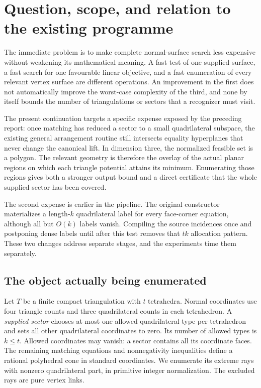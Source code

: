 \section{Question, scope, and relation to the existing programme}
\label{sec:context}

The immediate problem is to make complete normal-surface search less
expensive without weakening its mathematical meaning.  A fast test of
one supplied surface, a fast search for one favourable linear objective,
and a fast enumeration of every relevant vertex surface are different
operations.  An improvement in the first does not automatically improve
the worst-case complexity of the third, and none by itself bounds the
number of triangulations or sectors that a recognizer must visit.

The present continuation targets a specific expense exposed by the
preceding report: once matching has reduced a sector to a small
quadrilateral subspace, the existing general arrangement routine still
intersects equality hyperplanes that never change the canonical lift.
In dimension three, the normalized feasible set is a polygon.  The
relevant geometry is therefore the overlay of the actual planar regions
on which each triangle potential attains its minimum.  Enumerating those
regions gives both a stronger output bound and a direct certificate that
the whole supplied sector has been covered.

The second expense is earlier in the pipeline.  The original constructor
materializes a length-\(k\) quadrilateral label for every face-corner
equation, although all but \(O(k)\) labels vanish.  Compiling the
source incidences once and postponing dense labels until after this
test removes that \(tk\) allocation pattern.  These two changes address
separate stages, and the experiments time them separately.

\subsection{The object actually being enumerated}

Let \(T\) be a finite compact triangulation with \(t\) tetrahedra.
Normal coordinates use four triangle counts and three quadrilateral
counts in each tetrahedron.  A \emph{supplied sector} chooses at most
one allowed quadrilateral type per tetrahedron and sets all other
quadrilateral coordinates to zero.  Its number of allowed types is
\(k\le t\).  Allowed coordinates may vanish: a sector contains all its
coordinate faces.  The remaining matching equations and nonnegativity
inequalities define a rational polyhedral cone in standard coordinates.
We enumerate its extreme rays with nonzero quadrilateral part, in
primitive integer normalization.  The excluded rays are pure vertex
links.


